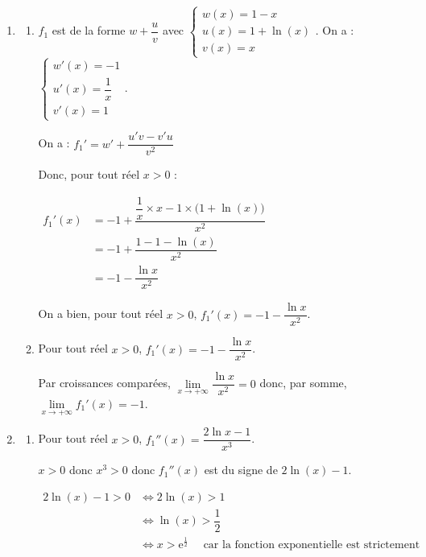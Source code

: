\documentclass[10pt]{article}
\providecommand{\e}{{\mathrm{e}}}
\begin{document}
\begin{enumerate}
	\item \begin{enumerate}
		\item  $f_1$ est de la forme $w + \dfrac{u}{v}$ avec $\begin{cases}w(x)= 1-x \\ u(x)=1+\ln(x) \\ v(x)= x  \end{cases} $.  \quad On a : $\begin{cases}w'(x)= -1 \\ u'(x)=\dfrac{1}{x} \\ v'(x)= 1  \end{cases} $. 
		
		On a : $f_1'= w'+ \dfrac{u'v - v'u}{v^2}$
		
		Donc, pour tout réel $x>0$ : 
		
		$\begin{aligned}
		f_1'(x) &= -1 + \dfrac{\dfrac{1}{x} \times x- 1 \times \big( 1 +\ln(x) \big) }{x^2} \\
		&= -1 + \dfrac{1- 1 -\ln(x)}{x^2} \\
		&= -1-\dfrac{\ln x}{x^2}
		\end{aligned}$
		
		
		
		
		
		On a bien,  pour tout réel $x>0$, \quad  $f_{1}'(x)=-1-\dfrac{\ln x}{x^2}$.
		
		\item  Pour tout réel $x>0$, \quad $f_{1}'(x)=-1-\dfrac{\ln x}{x^2} $. 
		
		
		Par croissances comparées, $	\lim\limits_{x\to +\infty } \dfrac{\ln x}{x^2}  = 0 $  donc, par somme, $\lim\limits_{x \to +\infty } f_1'(x)= - 1$.  
	
	\end{enumerate}
	
	\item 
	
	\begin{enumerate}
		\item  Pour tout réel $x>0$, \quad  $f_{1}''(x)=\dfrac{2 \ln x-1}{x^{3}}$.
		
		
		$x>0$ donc $x^3>0$ donc $f_1''(x)$ est du signe de $2\ln (x) -1$. 
		
		$\begin{aligned}  2\ln (x) -1>0 &\iff 2\ln(x) >1 \\
			&\iff \ln(x) > \dfrac{1}{2} \\
			&\iff x > \e^{\frac{1}{2}} \quad \text{ car la fonction exponentielle est strictement croissante}
			\end{aligned}$
			

\end{enumerate}
\end{enumerate}
\end{document}
